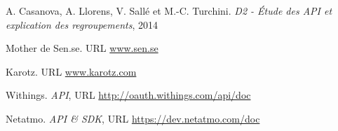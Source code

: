 \documentclass[nocopyrightspace]{sigplanconf}
\begin{document}




\begin{thebibliography}{10}
\softraggedright

A. Casanova, A. Llorens, V. Sallé et M.-C. Turchini.
\newblock \emph{D2 - Étude des API et explication des regroupements},
2014

Mother de Sen.se.
\newblock URL \url{www.sen.se}

Karotz.
\newblock URL \url{www.karotz.com}

Withings.
\newblock \emph{API},
\newblock URL \url{http://oauth.withings.com/api/doc}

Netatmo.
\newblock \emph{API \& SDK},
\newblock URL \url{https://dev.netatmo.com/doc}

\end{thebibliography}
\end{document}
